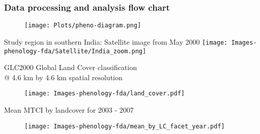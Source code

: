 \documentclass{beamer}
\begin{document}
\frame
{
\frametitle{Data processing and analysis flow chart }
\begin{figure} %
   \begin{center}
   \texttt{[image: Plots/pheno-diagram.png]} 
   \end{center}
\end{figure}
}

\begin{frame}[t]{Study region in southern India: Satellite image from May 2000}
	\texttt{[image: Images-phenology-fda/Satellite/India\_zoom.png]} 
\end{frame}

\begin{frame}[t]{GLC2000 Global Land Cover classification \\@ 4.6 km by 4.6 km spatial resolution}
	\begin{figure} 
		\texttt{[image: Images-phenology-fda/land\_cover.pdf]} 
	\end{figure}
\end{frame}

\begin{frame}[t]{Mean MTCI by landcover for 2003 - 2007}
	\begin{figure}    
		\texttt{[image: Images-phenology-fda/mean\_by\_LC\_facet\_year.pdf]} 
	\end{figure}
\end{frame}
\end{document}
